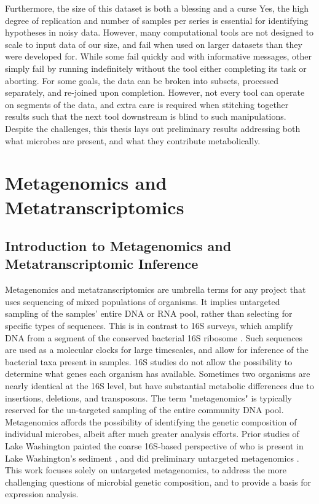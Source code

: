 Furthermore, the size of this dataset is both a blessing and a curse
Yes, the high degree of replication and number of samples per series is essential for identifying hypotheses in noisy data.
However, many computational tools are not designed to scale to input data of our size, and fail when used on larger datasets than they were developed for.
While some fail quickly and with informative messages, other simply fail by running indefinitely without the tool either completing its task or aborting.
For some goals, the data can be broken into subsets, processed separately, and re-joined upon completion.
However, not every tool can operate on segments of the data, and extra care is required when stitching together results such that the next tool downstream is blind to such manipulations.
Despite the challenges, this thesis lays out preliminary results addressing both what microbes are present, and what they contribute metabolically.


\section{Metagenomics and Metatranscriptomics}

\subsection{Introduction to Metagenomics and Metatranscriptomic Inference}
Metagenomics and metatranscriptomics are umbrella terms for any project that uses sequencing of mixed populations of organisms.
It implies untargeted sampling of the samples' entire DNA or RNA pool, rather than selecting for specific types of sequences.
This is in contrast to 16S surveys, which amplify DNA from a segment of the conserved bacterial 16S ribosome \cite{kunin2008}.
Such sequences are used as a molecular clocks for large timescales, and allow for inference of the bacterial taxa present in samples.
16S studies do not allow the possibility to determine what genes each organism has available.
Sometimes two organisms are nearly identical at the 16S level, but have substantial metabolic differences due to insertions, deletions, and transposons.  %
The term "metagenomics" is typically reserved for the un-targeted sampling of the entire community DNA pool.
Metagenomics affords the possibility of identifying the genetic composition of individual microbes, albeit after much greater analysis efforts.
Prior studies of Lake Washington painted the coarse 16S-based perspective of who is present in Lake Washington's sediment \cite{beck2013LW, hernandez2015LW, oshkin2015LW}, and did preliminary untargeted metagenomics \cite{beck2013LW, oshkin2015LW}.
This work focuses solely on untargeted metagenomics, to address the more challenging questions of microbial genetic composition, and to provide a basis for expression analysis.

